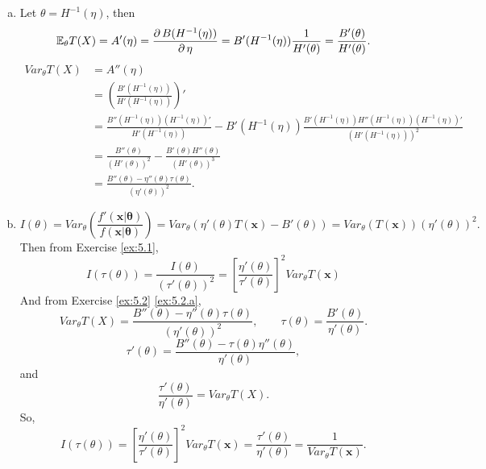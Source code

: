 \begin{solution}
    \begin{enumerate}[(a)]
        \item \label{ex:5.2.a} Let $\theta=H^{-1}(\eta)$, then 
        \[
            \mathbb{E}_\theta T(X) = A'(\eta) =\frac{\partial\, B(H^{-1}(\eta))}{\partial\, \eta}=B'(H^{-1}(\eta))\frac{1}{H'(\theta)}=\frac{B'(\theta)}{H'(\theta)}. 
        \]
        \[
            \begin{aligned}
                Var_\theta T(X)&=A''(\eta)\\
                &=\left(\frac{B'(H^{-1}(\eta))}{H'(H^{-1}(\eta))}\right)'\\
                &=\frac{B''(H^{-1}(\eta))(H^{-1}(\eta))'}{H'(H^{-1}(\eta))}-B'(H^{-1}(\eta))\frac{B'(H^{-1}(\eta))H''(H^{-1}(\eta))(H^{-1}(\eta))'}{\left(H'(H^{-1}(\eta))\right)^2}\\
                &=\frac{B''(\theta)}{(H'(\theta))^2}-\frac{B'(\theta)H''(\theta)}{(H'(\theta))^3}\\
                &=\frac{B''(\theta)-\eta''(\theta)\tau(\theta)}{(\eta'(\theta))^2}. 
            \end{aligned}
        \]
        \item \[
            I(\theta)=Var_\theta\left(\frac{f'(\mathbf{x|\theta})}{f(\mathbf{x|\theta})}\right)=Var_{\theta}(\eta'(\theta)T(\mathbf{x})-B'(\theta))=Var_\theta(T(\mathbf{x}))(\eta'(\theta))^2. 
        \]
        Then from Exercise \ref{ex:5.1}, 
        \[
            I(\tau(\theta))=\frac{I(\theta)}{(\tau'(\theta))^2}=\left[\frac{\eta'(\theta)}{\tau'(\theta)}\right]^2Var_\theta T(\mathbf{x})
        \]
        And from Exercise \ref{ex:5.2} \ref{ex:5.2.a},
        \[
            Var_\theta T(X)=\frac{B''(\theta)-\eta''(\theta)\tau(\theta)}{(\eta'(\theta))^2}, \qquad \tau(\theta)=\frac{B'(\theta)}{\eta'(\theta)}. 
        \]
        \[
            \tau'(\theta)=\frac{B''(\theta)-\tau(\theta)\eta''(\theta)}{\eta'(\theta)}, 
        \]
        and \[
            \frac{\tau'(\theta)}{\eta'(\theta)}=Var_\theta T(X).
        \]
        So, 
        \[
            I(\tau(\theta))=\left[\frac{\eta'(\theta)}{\tau'(\theta)}\right]^2Var_\theta T(\mathbf{x})=\frac{\tau'(\theta)}{\eta'(\theta)}=\frac{1}{Var_\theta T(\mathbf{x})}. 
        \]
    \end{enumerate}
\end{solution}

